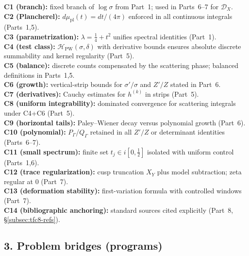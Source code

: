 \noindent
\textbf{C1 (branch):} fixed branch of $\log\sigma$ from Part~1; used in Parts~6--7 for $\mathscr{D}_X$. \\
\textbf{C2 (Plancherel):} $d\mu_{\mathrm{pl}}(t)=dt/(4\pi)$ enforced in all continuous integrals (Parts~1,5). \\
\textbf{C3 (parametrization):} $\lambda=\tfrac14+t^{2}$ unifies spectral identities (Part~1). \\
\textbf{C4 (test class):} $\mathcal{H}_{\mathrm{PW}}(\sigma,\delta)$ with derivative bounds ensures absolute discrete summability and kernel regularity (Part~5). \\
\textbf{C5 (balance):} discrete counts compensated by the scattering phase; balanced definitions in Parts~1,5. \\
\textbf{C6 (growth):} vertical-strip bounds for $\sigma'/\sigma$ and $Z'/Z$ stated in Part~6. \\
\textbf{C7 (derivatives):} Cauchy estimates for $h^{(k)}$ in strips (Part~5). \\
\textbf{C8 (uniform integrability):} dominated convergence for scattering integrals under C4+C6 (Part~5). \\
\textbf{C9 (horizontal tails):} Paley–Wiener decay versus polynomial growth (Part~6). \\
\textbf{C10 (polynomial):} $P_\Gamma$/$Q_\Gamma$ retained in all $Z'/Z$ or determinant identities (Parts~6--7). \\
\textbf{C11 (small spectrum):} finite set $t_j\in i[0,\tfrac12]$ isolated with uniform control (Parts~1,6). \\
\textbf{C12 (trace regularization):} cusp truncation $X_Y$ plus model subtraction; zeta regular at $0$ (Part~7). \\
\textbf{C13 (deformation stability):} first-variation formula with controlled windows (Part~7). \\
\textbf{C14 (bibliographic anchoring):} standard sources cited explicitly (Part~8, \S\ref{subsec:tfc8-refs}). \relax\hspace{0pt}

\subsection*{3. Problem bridges (programs)}\relax\hspace{0pt}
\label{subsec:tfc8-bridges} %

